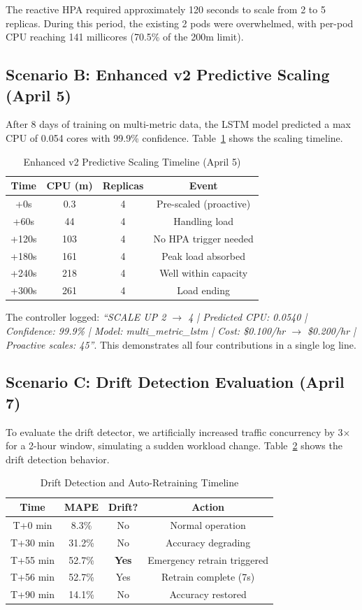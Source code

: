 \documentclass[journal]{IEEEtran}
\begin{document}
The reactive HPA required approximately 120 seconds to scale from 2 to 5 replicas. During this period, the existing 2 pods were overwhelmed, with per-pod CPU reaching 141 millicores (70.5\% of the 200m limit).

\subsection{Scenario B: Enhanced v2 Predictive Scaling (April 5)}
After 8 days of training on multi-metric data, the LSTM model predicted a max CPU of 0.054 cores with 99.9\% confidence. Table~\ref{tab:after} shows the scaling timeline.

\begin{table}[h]
\centering
\caption{Enhanced v2 Predictive Scaling Timeline (April 5)}
\label{tab:after}
\begin{tabular}{@{}cccc@{}}
\toprule
\textbf{Time} & \textbf{CPU (m)} & \textbf{Replicas} & \textbf{Event} \\
\midrule
+0s & 0.3 & 4 & Pre-scaled (proactive) \\
+60s & 44 & 4 & Handling load \\
+120s & 103 & 4 & No HPA trigger needed \\
+180s & 161 & 4 & Peak load absorbed \\
+240s & 218 & 4 & Well within capacity \\
+300s & 261 & 4 & Load ending \\
\bottomrule
\end{tabular}
\end{table}

The controller logged: \textit{``SCALE UP 2 $\to$ 4 | Predicted CPU: 0.0540 | Confidence: 99.9\% | Model: multi\_metric\_lstm | Cost: \$0.100/hr $\to$ \$0.200/hr | Proactive scales: 45''}. This demonstrates all four contributions in a single log line.

\subsection{Scenario C: Drift Detection Evaluation (April 7)}
To evaluate the drift detector, we artificially increased traffic concurrency by 3$\times$ for a 2-hour window, simulating a sudden workload change. Table~\ref{tab:drift} shows the drift detection behavior.

\begin{table}[h]
\centering
\caption{Drift Detection and Auto-Retraining Timeline}
\label{tab:drift}
\begin{tabular}{@{}cccc@{}}
\toprule
\textbf{Time} & \textbf{MAPE} & \textbf{Drift?} & \textbf{Action} \\
\midrule
T+0 min & 8.3\% & No & Normal operation \\
T+30 min & 31.2\% & No & Accuracy degrading \\
T+55 min & 52.7\% & \textbf{Yes} & Emergency retrain triggered \\
T+56 min & 52.7\% & Yes & Retrain complete (7s) \\
T+90 min & 14.1\% & No & Accuracy restored \\
\bottomrule
\end{tabular}
\end{table}
\end{document}
